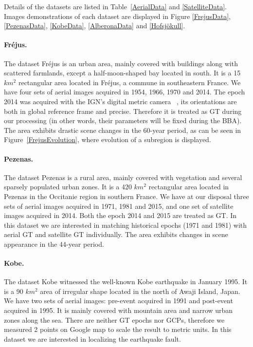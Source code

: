 Details of the datasets are listed in Table~\ref{AerialData} and \ref{SatelliteData}. 
Images demonstrations of each dataset are displayed in Figure \ref{FrejusData}, \ref{PezenasData}, \ref{KobeData}, \ref{AlberonaData} and \ref{Hofsjökull}.


\paragraph{Fr{\'e}jus.}
The dataset Fr{\'e}jus is an urban area, mainly covered with buildings along with scattered farmlands, except a half-moon-shaped bay located in south. It is a 15 $km^2$ rectangular area located in Fr{\'e}jus, a commune in southeastern France. We have four sets of aerial images acquired in 1954, 1966, 1970 and 2014. The epoch 2014 was acquired with the \ac{IGN}'s digital metric camera ~\cite{souchon2010ign}, its orientations are both in global reference frame and precise. Therefore it is treated as \ac{GT} during our processing (in other words, their parameters will be fixed during the \ac{BBA}). 
The area exhibits drastic scene changes in the 60-year period, as can be seen in Figure~\ref{FrejusEvolution}, where evolution of a subregion is displayed.\\

\paragraph{Pezenas.}
The dataset Pezenas is a rural area, mainly covered with vegetation and several sparsely populated urban zones. It is a 420 $km^2$ rectangular area located in Pezenas in the Occitanie region in southern France. We have at our disposal three sets of aerial images acquired in 1971, 1981 and 2015, and one set of satellite images acquired in 2014. Both the epoch 2014 and 2015 are treated as \ac{GT}. In this dataset we are interested in matching historical epochs (1971 and 1981) with aerial \ac{GT} and satellite \ac{GT} individually. The area exhibits changes in scene appearance in the 44-year period.\\

\paragraph{Kobe.}
The dataset Kobe witnessed the well-known Kobe earthquake in January 1995. It is a 90 $km^2$ area of irregular shape located in the north of Awaji Island, Japan. We have two sets of aerial images: pre-event acquired in 1991 and post-event acquired in 1995. It is mainly covered with mountain area and narrow urban zones along the sea. There are neither \ac{GT} epochs nor \ac{GCP}s, therefore we measured 2 points on Google map to scale the result to metric units. In this dataset we are interested in localizing the earthquake fault.

